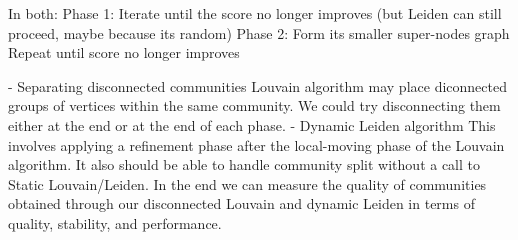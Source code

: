In both:
Phase 1: Iterate until the score no longer improves (but Leiden can still proceed, maybe because its random)
Phase 2: Form its smaller super-nodes graph
Repeat until score no longer improves



- Separating disconnected communities
Louvain algorithm may place diconnected groups of vertices within the same community. We could try disconnecting them either at the end or at the end of each phase.
- Dynamic Leiden algorithm
This involves applying a refinement phase after the local-moving phase of the Louvain algorithm. It also should be able to handle community split without a call to Static Louvain/Leiden.
In the end we can measure the quality of communities obtained through our disconnected Louvain and dynamic Leiden in terms of quality, stability, and performance.
